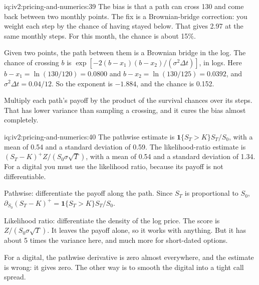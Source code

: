\begin{solution}{iq:iv2:pricing-and-numerics:39}
The bias is that a path can cross 130 and come back between two monthly points. The fix is a Brownian-bridge correction: you weight each step by the chance of having stayed below. That gives 2.97 at the same monthly steps. For this month, the chance is about 15\%.

Given two points, the path between them is a Brownian bridge in the log. The chance of crossing $b$ is $\exp[-2(b - x_1)(b - x_2)/(\sigma^2\Delta t)]$, in logs. Here $b - x_1 = \ln(130/120) = 0.0800$ and $b - x_2 = \ln(130/125) = 0.0392$, and $\sigma^2\Delta t = 0.04/12$. So the exponent is $-1.884$, and the chance is 0.152.

Multiply each path's payoff by the product of the survival chances over its steps. That has lower variance than sampling a crossing, and it cures the bias almost completely.

\end{solution}

\begin{solution}{iq:iv2:pricing-and-numerics:40}
The pathwise estimate is $\mathbf 1\{S_T > K\}S_T/S_0$, with a mean of 0.54 and a standard deviation of 0.59. The likelihood-ratio estimate is $(S_T - K)^+Z/(S_0\sigma\sqrt T)$, with a mean of 0.54 and a standard deviation of 1.34. For a digital you must use the likelihood ratio, because its payoff is not differentiable.

Pathwise: differentiate the payoff along the path. Since $S_T$ is proportional to $S_0$, $\partial_{S_0}(S_T - K)^+ = \mathbf 1\{S_T > K\}S_T/S_0$.

Likelihood ratio: differentiate the density of the log price. The score is $Z/(S_0\sigma\sqrt T)$. It leaves the payoff alone, so it works with anything. But it has about 5 times the variance here, and much more for short-dated options.

For a digital, the pathwise derivative is zero almost everywhere, and the estimate is wrong: it gives zero. The other way is to smooth the digital into a tight call spread.

\end{solution}

